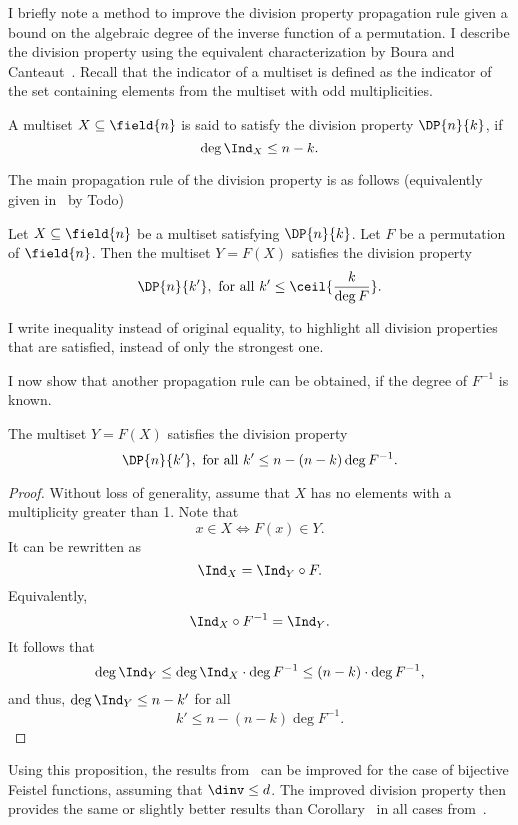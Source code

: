 
I briefly note a method to improve the division property propagation rule given a bound on the algebraic degree of the inverse function of a permutation. I describe the division property using the equivalent characterization by Boura and Canteaut~\cite{anotherview}. Recall that the indicator of a multiset is defined as the indicator of the set containing elements from the multiset with odd multiplicities.

\begin{definition}
A multiset $X \subseteq \field{n}$ is said to satisfy the division property $\DP{n}{k}$, if
$$
\deg{\Ind_X} \le n - k.
$$
\end{definition}

The main propagation rule of the division property is as follows (equivalently given in~\cite{division} by Todo)
\begin{proposition}
Let $X \subseteq \field{n}$ be a multiset satisfying $\DP{n}{k}$. Let $F$ be a permutation of $\field{n}$. Then the multiset $Y = F(X)$ satisfies the division property
$$
\DP{n}{k'}, ~\text{for all}~k' \le \ceil{\frac{k}{\deg{F}}}.
$$
\end{proposition}
\begin{remark}
I write inequality instead of original equality, to highlight all division properties that are satisfied, instead of only the strongest one.
\end{remark}

I now show that another propagation rule can be obtained, if the degree of $F^{-1}$ is known.

\begin{proposition}
The multiset $Y = F(X)$ satisfies the division property
$$
\DP{n}{k'}, ~\text{for all}~k' \le n - (n-k) \deg{F^{-1}}.
$$
\end{proposition}
\begin{proof}
Without loss of generality, assume that $X$ has no elements with a multiplicity greater than 1. Note that
$$
x \in X \Leftrightarrow F(x) \in Y.
$$
It can be rewritten as 
$$
\Ind_X = \Ind_Y\circ F.
$$
Equivalently,
$$
\Ind_X \circ F^{-1} = \Ind_Y.
$$
It follows that
$$
\deg{\Ind_Y} \le \deg{\Ind_X} \cdot \deg{F^{-1}} \le (n - k)\cdot \deg{F^{-1}},
$$
and thus, $\deg{\Ind_Y} \le n - k'$ for all
$$
k' \le n - (n - k) \deg{F^{-1}}.
$$
\end{proof}

Using this proposition, the results from~\cite{division} can be improved for the case of bijective Feistel functions, assuming that $\dinv \le d$. The improved division property then provides the same or slightly better results than Corollary~ in all cases from~\cite{division}.